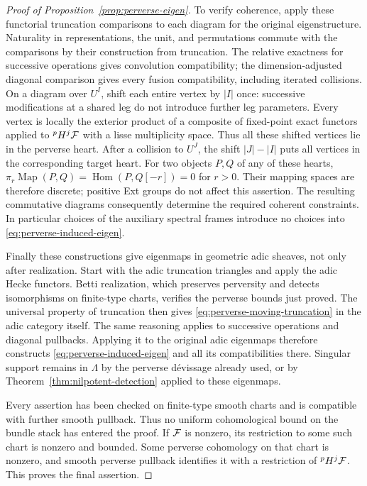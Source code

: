 \begin{proof}[Proof of Proposition~\ref{prop:perverse-eigen}]
To verify coherence, apply these functorial truncation comparisons
to each diagram for the original eigenstructure.  Naturality in
representations, the unit, and permutations commute with the
comparisons by their construction from truncation.  The relative
exactness for successive operations gives convolution compatibility;
the dimension-adjusted diagonal comparison gives every fusion
compatibility, including iterated collisions.  On a diagram over
$U^I$, shift each entire vertex by $|I|$ once: successive
modifications at a shared leg do not introduce further leg
parameters.  Every vertex is locally the exterior product of a
composite of fixed-point exact functors applied to ${}^pH^j\mathcal F$
with a lisse multiplicity space.  Thus all these shifted vertices
lie in the perverse heart.  After a collision to $U^J$, the shift
$|J|-|I|$ puts all vertices in the corresponding target heart.
For two objects $P,Q$ of any of these hearts,
$\pi_r\operatorname{Map}(P,Q)=\operatorname{Hom}(P,Q[-r])=0$
for $r>0$.  Their mapping spaces are therefore discrete; positive
Ext groups do not affect this assertion.  The resulting
commutative diagrams consequently determine the required coherent
constraints.  In particular choices of the auxiliary spectral
frames introduce no choices into \eqref{eq:perverse-induced-eigen}.

Finally these constructions give eigenmaps in geometric adic
sheaves, not only after realization.  Start with the adic
truncation triangles and apply the adic Hecke functors.  Betti
realization, which preserves perversity and detects isomorphisms
on finite-type charts, verifies the perverse bounds just proved.
The universal property of truncation then gives
\eqref{eq:perverse-moving-truncation} in the adic category itself.
The same reasoning applies to successive operations and diagonal
pullbacks.  Applying it to the original adic eigenmaps therefore
constructs \eqref{eq:perverse-induced-eigen} and all its
compatibilities there.  Singular support remains in $\Lambda$
by the perverse d\'evissage already used, or by
Theorem~\ref{thm:nilpotent-detection} applied to these eigenmaps.

Every assertion has been checked on finite-type smooth charts and
is compatible with further smooth pullback.  Thus no uniform
cohomological bound on the bundle stack has entered the proof.
If $\mathcal F$ is nonzero, its restriction to some such chart is
nonzero and bounded.  Some perverse cohomology on that chart is
nonzero, and smooth perverse pullback identifies it with a
restriction of ${}^pH^j\mathcal F$.  This proves the final assertion.
\end{proof}
